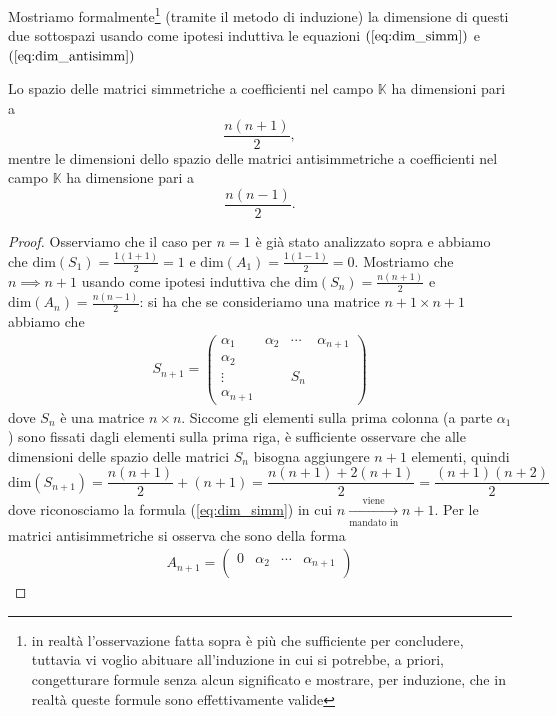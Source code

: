 Mostriamo formalmente\footnote{in realtà l'osservazione fatta sopra è più che sufficiente per concludere, tuttavia vi voglio abituare all'induzione in cui si potrebbe, a priori, congetturare formule senza alcun significato e mostrare, per induzione, che in realtà queste formule sono effettivamente valide} (tramite il metodo di induzione) la dimensione di questi due sottospazi usando come ipotesi induttiva le equazioni $(\ref{eq:dim_simm})$ e $(\ref{eq:dim_antisimm})$
\begin{prop}
  Lo spazio delle matrici simmetriche a coefficienti nel campo $\mathbb{K}$ ha dimensioni pari a
  $$
    \frac{n(n+1)}{2},
  $$
  mentre le dimensioni dello spazio delle matrici antisimmetriche a coefficienti nel campo $\mathbb{K}$ ha dimensione pari a
  $$
    \frac{n(n-1)}{2}.
  $$
\end{prop}
\begin{proof}
  Osserviamo che il caso per $n=1$ è già stato analizzato sopra e abbiamo che $\text{dim}(S_1) = \frac{1(1+1)}{2} = 1$ e $\text{dim}(A_1) = \frac{1(1-1)}{2}=0$. Mostriamo che $n \implies n+1$ usando come ipotesi induttiva che $\text{dim}(S_n) = \frac{n(n+1)}{2}$ e $\text{dim}(A_n) = \frac{n(n-1)}{2}$: si ha che se consideriamo una matrice $n+1 \times n+1$ abbiamo che
  \begin{align}
  S_{n+1} =
  \begin{pmatrix}
    \alpha_1      & \alpha_2      & \cdots & \alpha_{n+1} \\
    \alpha_2      &               &        &              \\
    \vdots        &               & S_n    &              \\
    \alpha_{n+1}  &               &        &
  \end{pmatrix}
\end{align}
dove $S_n$ è una matrice $n \times n$. Siccome gli elementi sulla prima colonna (a parte $\alpha_1$) sono fissati dagli elementi sulla prima riga, è sufficiente osservare che alle dimensioni delle spazio delle matrici $S_n$ bisogna aggiungere $n+1$ elementi, quindi
$$
  \text{dim}(S_{n+1}) = \frac{n(n+1)}{2} + (n+1) = \frac{n(n+1) + 2(n+1)}{2} = \frac{(n+1)(n+2)}{2}
$$
dove riconosciamo la formula (\ref{eq:dim_simm}) in cui $n \underset{\text{mandato in}}{\stackrel{\text{viene}}{\rightarrow}} n+1$. Per le matrici antisimmetriche si osserva che sono della forma
\begin{align}
A_{n+1} =
  \begin{pmatrix}
    0      & \alpha_2      & \cdots & \alpha_{n+1} \\

\end{pmatrix}
\end{align}
\end{proof}
